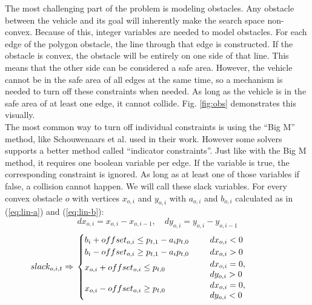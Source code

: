 The most challenging part of the problem is modeling obstacles. Any obstacle between the vehicle and its goal will inherently make the search space non-convex. Because of this, integer variables are needed to model obstacles. For each edge of the polygon obstacle, the line through that edge is constructed. If the obstacle is convex, the obstacle will be entirely on one side of that line. This means that the other side can be considered a safe area. However, the vehicle cannot be in the safe area of all edges at the same time, so a mechanism is needed to turn off these constraints when needed. As long as the vehicle is in the safe area of at least one edge, it cannot collide.  Fig. \ref{fig:obs} demonstrates this visually. \\
The most common way to turn off individual constraints is using the ``Big M'' method, like Schouwenaars et al. \cite{Schouwenaars2001} used in their work. However some solvers supports a better method called ``indicator constraints''. Just like with the Big M method, it requires one boolean variable per edge. If the variable is true, the corresponding constraint is ignored. As long as at least one of those variables if false, a collision cannot happen. We will call these slack variables. For every convex obstacle $o$ with vertices $x_{o,i}$ and $y_{o,i}$ with $a_{o,i}$ and $b_{o,i}$ calculated as in (\ref{eq:lin-a}) and (\ref{eq:lin-b}):
\begin{equation*}
dx_{o,i} = x_{o,i} - x_{o,i-1}, \quad dy_{o,i} = y_{o,i} - y_{o,i-1}
\end{equation*}
\begin{equation}
\label{eq:obs}
slack_{o,i,t} \Rightarrow \\
\begin{cases}
b_i + offset_{o,i} \leq p_{t,1} - a_i p_{t,0} & dx_{o,i} < 0 \\
b_i - offset_{o,i}  \geq p_{t,1} - a_i p_{t,0} & dx_{o,i} > 0 \\
\parbox[t]{.4\columnwidth}{ \vspace{-0.25\baselineskip} $x_{o,i} + offset_{o,i}  \leq p_{t,0}$ } & \parbox[t]{.25\columnwidth}{ $dx_{o,i} = 0$, \\ $dy_{o,i} > 0$ } \\
\parbox[t]{.4\columnwidth}{ \vspace{-0.25\baselineskip} $x_{o,i} - offset_{o,i}  \geq p_{t,0}$ } & \parbox[t]{.25\columnwidth}{ $dx_{o,i} = 0$, \\ $dy_{o,i} < 0$ } \\
\end{cases}
\end{equation}
